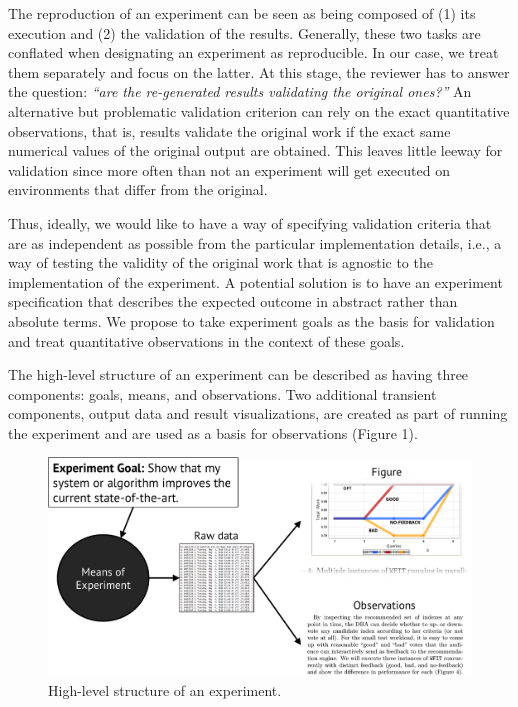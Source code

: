 \documentclass[10pt,reprint]{sigplanconf}
\begin{document}
The reproduction of an experiment can be seen as being composed of (1)
its execution and (2) the validation of the results. Generally, these
two tasks are conflated when designating an experiment as reproducible.
In our case, we treat them separately and focus on the latter. At this
stage, the reviewer has to answer the question: \emph{``are the
re-generated results validating the original ones?''} An alternative but
problematic validation criterion can rely on the exact quantitative
observations, that is, results validate the original work if the exact
same numerical values of the original output are obtained. This leaves
little leeway for validation since more often than not an experiment
will get executed on environments that differ from the original.

Thus, ideally, we would like to have a way of specifying validation
criteria that are as independent as possible from the particular
implementation details, i.e., a way of testing the validity of the
original work that is agnostic to the implementation of the experiment.
A potential solution is to have an experiment specification that
describes the expected outcome in abstract rather than absolute terms.
We propose to take experiment goals as the basis for validation and
treat quantitative observations in the context of these goals.


The high-level structure of an experiment can be described as having
three components: goals, means, and observations. Two additional
transient components, output data and result visualizations, are created
as part of running the experiment and are used as a basis for
observations (Figure 1).

\begin{figure}[htbp]
\centering
\includegraphics{figures/goals.png}
\caption{High-level structure of an experiment.}
\end{figure}
\end{document}
